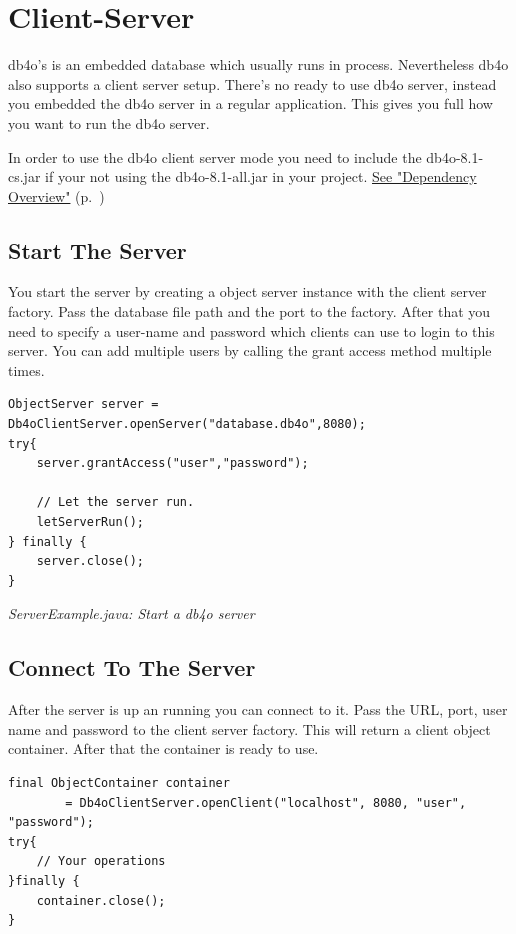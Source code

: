 
\chapter{Client-Server}
\label{ref:client-server}

db4o's is an embedded database which usually runs in process. Nevertheless db4o also supports a client server setup. There's no ready to use db4o server, instead you embedded the db4o server in a regular application. This gives you full how you want to run the db4o server.

In order to use the db4o client server mode you need to include the db4o-8.1-cs.jar if your not using the db4o-8.1-all.jar in your project. \hyperref[ref:dependency-overview]{See "Dependency Overview"} (p.~\pageref{ref:dependency-overview})

\section*{Start The Server}

You start the server by creating a object server instance with the client server factory. Pass the database file path and the port to the factory. After that you need to specify a user-name and password which clients can use to login to this server. You can add multiple users by calling the grant access method multiple times.

\begin{lstlisting}
ObjectServer server = Db4oClientServer.openServer("database.db4o",8080);
try{
    server.grantAccess("user","password");

    // Let the server run.
    letServerRun();
} finally {
    server.close();
}
\end{lstlisting}

{\small\itshape ServerExample.java: Start a db4o server\par}
\medskip

\section*{Connect To The Server}

After the server is up an running you can connect to it. Pass the URL, port, user name and password to the client server factory. This will return a client object container. After that the container is ready to use.

\begin{lstlisting}
final ObjectContainer container
        = Db4oClientServer.openClient("localhost", 8080, "user", "password");
try{
    // Your operations
}finally {
    container.close();
}
\end{lstlisting}

